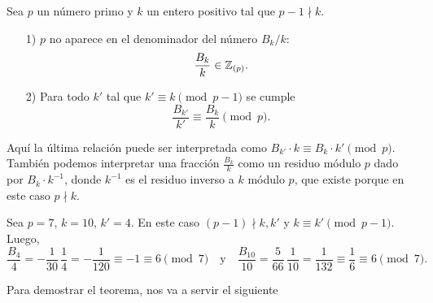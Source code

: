 \documentclass{article}
\begin{document}
\begin{teorema*}[Kummer, 1851]
Sea $p$ un número primo y $k$ un entero positivo tal que $p-1 \nmid k$.

\begin{enumerate}
\item[1)] $p$ no aparece en el denominador del número $B_k/k$:
$$\frac{B_k}{k} \in \mathbb{Z}_{(p)}.$$

\item[2)] Para todo $k'$ tal que $k' \equiv k \pmod{p-1}$ se cumple
$$\frac{B_{k'}}{k'} \equiv \frac{B_k}{k} \pmod{p}.$$
\end{enumerate}
\end{teorema*}

Aquí la última relación puede ser interpretada como $B_{k'}\cdot k \equiv B_k\cdot k' \pmod{p}$. También podemos interpretar una fracción $\frac{B_k}{k}$ como un residuo módulo $p$ dado por $B_k\cdot k^{-1}$, donde $k^{-1}$ es el residuo inverso a $k$ módulo $p$, que existe porque en este caso $p \nmid k$.

\begin{ejemplo*}
Sea $p = 7$, $k = 10$, $k' = 4$. En este caso $(p-1) \nmid k, k'$ y $k \equiv k' \pmod{p-1}$. Luego,
$$\frac{B_4}{4} = -\frac{1}{30}\,\frac{1}{4} = -\frac{1}{120} \equiv -1 \equiv 6 \pmod{7} \quad\text{y}\quad \frac{B_{10}}{10} = \frac{5}{66}\,\frac{1}{10} = \frac{1}{132} \equiv \frac{1}{6} \equiv 6 \pmod{7}.$$
\end{ejemplo*}

Para demostrar el teorema, nos va a servir el siguiente
\end{document}
